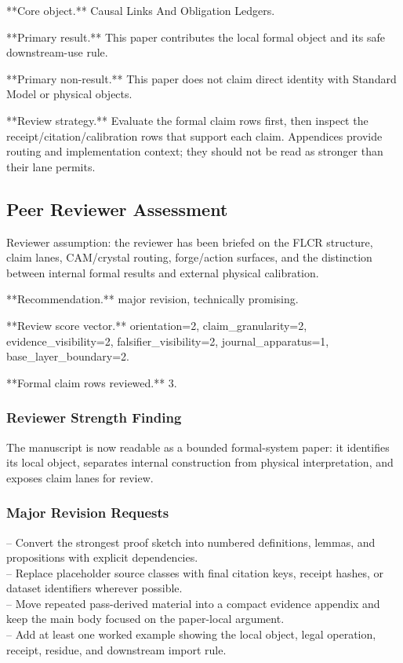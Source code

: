 \documentclass[11pt]{article}
\begin{document}
**Core object.** Causal Links And Obligation Ledgers.

**Primary result.** This paper contributes the local formal object and its safe downstream-use rule.

**Primary non-result.** This paper does not claim direct identity with Standard Model or physical objects.

**Review strategy.** Evaluate the formal claim rows first, then inspect the receipt/citation/calibration rows that support each claim. Appendices provide routing and implementation context; they should not be read as stronger than their lane permits.

\subsection*{Peer Reviewer Assessment}

Reviewer assumption: the reviewer has been briefed on the FLCR structure, claim lanes, CAM/crystal routing, forge/action surfaces, and the distinction between internal formal results and external physical calibration.

**Recommendation.** major revision, technically promising.

**Review score vector.** orientation=2, claim\_granularity=2, evidence\_visibility=2, falsifier\_visibility=2, journal\_apparatus=1, base\_layer\_boundary=2.

**Formal claim rows reviewed.** 3.

\subsubsection*{Reviewer Strength Finding}

The manuscript is now readable as a bounded formal-system paper: it identifies its local object, separates internal construction from physical interpretation, and exposes claim lanes for review.

\subsubsection*{Major Revision Requests}

\noindent{}-- Convert the strongest proof sketch into numbered definitions, lemmas, and propositions with explicit dependencies.\\
\noindent{}-- Replace placeholder source classes with final citation keys, receipt hashes, or dataset identifiers wherever possible.\\
\noindent{}-- Move repeated pass-derived material into a compact evidence appendix and keep the main body focused on the paper-local argument.\\
\noindent{}-- Add at least one worked example showing the local object, legal operation, receipt, residue, and downstream import rule.\\
\end{document}
